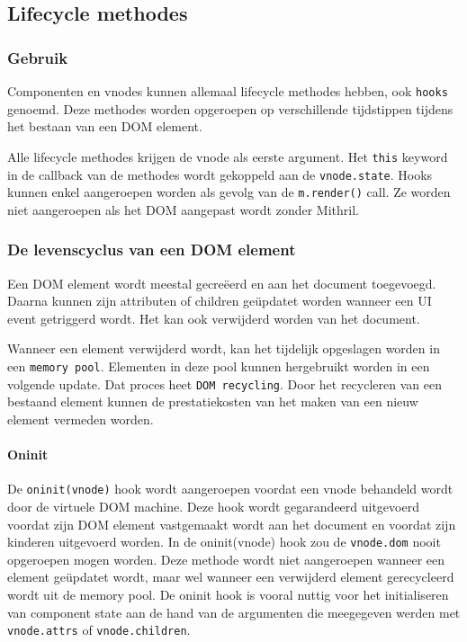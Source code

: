 \subsection{Lifecycle methodes}

\subsubsection{Gebruik}

Componenten en vnodes kunnen allemaal lifecycle methodes hebben, ook \texttt{hooks} genoemd. Deze methodes worden opgeroepen op verschillende tijdstippen tijdens het bestaan van een DOM element. \autocite{Mithril2019e}

Alle lifecycle methodes krijgen de vnode als eerste argument. Het \texttt{this} keyword in de callback van de methodes wordt gekoppeld aan de \texttt{vnode.state}. Hooks kunnen enkel aangeroepen worden als gevolg van de \texttt{m.render()} call. Ze worden niet aangeroepen als het DOM aangepast wordt zonder Mithril. \autocite{Mithril2019e}

\subsubsection{De levenscyclus van een DOM element}

Een DOM element wordt meestal gecreëerd en aan het document toegevoegd. Daarna kunnen zijn attributen of children geüpdatet worden wanneer een UI event getriggerd wordt. Het kan ook verwijderd worden van het document. \autocite{Mithril2019e}

Wanneer een element verwijderd wordt, kan het tijdelijk opgeslagen worden in een \texttt{memory pool}. Elementen in deze pool kunnen hergebruikt worden in een volgende update. Dat proces heet \texttt{DOM recycling}. Door het recycleren van een bestaand element kunnen de prestatiekosten van het maken van een nieuw element vermeden worden. \autocite{Mithril2019e}

\paragraph{Oninit}

De \texttt{oninit(vnode)} hook wordt aangeroepen voordat een vnode behandeld wordt door de virtuele DOM machine. Deze hook wordt gegarandeerd uitgevoerd voordat zijn DOM element vastgemaakt wordt aan het document en voordat zijn kinderen uitgevoerd worden. In de oninit(vnode) hook zou de \texttt{vnode.dom} nooit opgeroepen mogen worden. Deze methode wordt niet aangeroepen wanneer een element geüpdatet wordt, maar wel wanneer een verwijderd element gerecycleerd wordt uit de memory pool. De oninit hook is vooral nuttig voor het initialiseren van component state aan de hand van de argumenten die meegegeven werden met \texttt{vnode.attrs} of \texttt{vnode.children}. \autocite{Mithril2019e}

